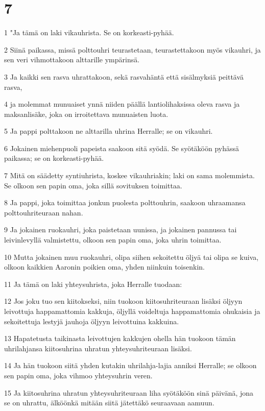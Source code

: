 \chapter{7}

\par 1 "Ja tämä on laki vikauhrista. Se on korkeasti-pyhää.
\par 2 Siinä paikassa, missä polttouhri teurastetaan, teurastettakoon myös vikauhri, ja sen veri vihmottakoon alttarille ympärinsä.
\par 3 Ja kaikki sen rasva uhrattakoon, sekä rasvahäntä että sisälmyksiä peittävä rasva,
\par 4 ja molemmat munuaiset ynnä niiden päällä lantiolihaksissa oleva rasva ja maksanlisäke, joka on irroitettava munuaisten luota.
\par 5 Ja pappi polttakoon ne alttarilla uhrina Herralle; se on vikauhri.
\par 6 Jokainen miehenpuoli papeista saakoon sitä syödä. Se syötäköön pyhässä paikassa; se on korkeasti-pyhää.
\par 7 Mitä on säädetty syntiuhrista, koskee vikauhriakin; laki on sama molemmista. Se olkoon sen papin oma, joka sillä sovituksen toimittaa.
\par 8 Ja pappi, joka toimittaa jonkun puolesta polttouhrin, saakoon uhraamansa polttouhriteuraan nahan.
\par 9 Ja jokainen ruokauhri, joka paistetaan uunissa, ja jokainen pannussa tai leivinlevyllä valmistettu, olkoon sen papin oma, joka uhrin toimittaa.
\par 10 Mutta jokainen muu ruokauhri, olipa siihen sekoitettu öljyä tai olipa se kuiva, olkoon kaikkien Aaronin poikien oma, yhden niinkuin toisenkin.
\par 11 Ja tämä on laki yhteysuhrista, joka Herralle tuodaan:
\par 12 Jos joku tuo sen kiitokseksi, niin tuokoon kiitosuhriteuraan lisäksi öljyyn leivottuja happamattomia kakkuja, öljyllä voideltuja happamattomia ohukaisia ja sekoitettuja lestyjä jauhoja öljyyn leivottuina kakkuina.
\par 13 Hapatetusta taikinasta leivottujen kakkujen ohella hän tuokoon tämän uhrilahjansa kiitosuhrina uhratun yhteysuhriteuraan lisäksi.
\par 14 Ja hän tuokoon siitä yhden kutakin uhrilahja-lajia anniksi Herralle; se olkoon sen papin oma, joka vihmoo yhteysuhrin veren.
\par 15 Ja kiitosuhrina uhratun yhteysuhriteuraan liha syötäköön sinä päivänä, jona se on uhrattu, älköönkä mitään siitä jätettäkö seuraavaan aamuun.
